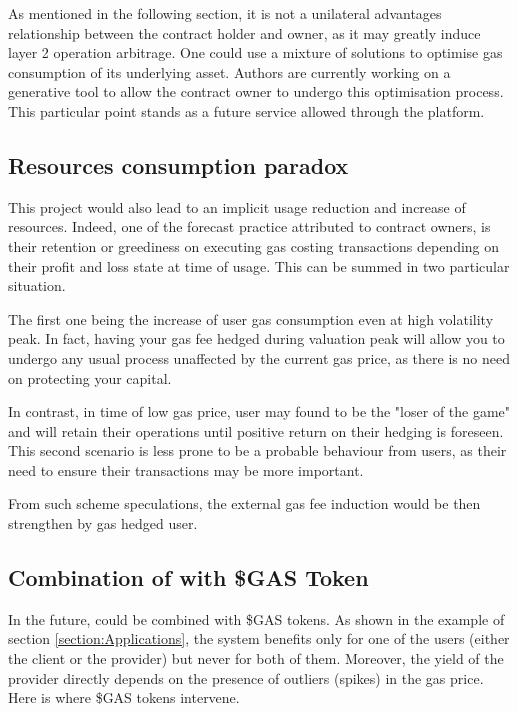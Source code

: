     As mentioned in the following section, it is not a unilateral advantages relationship between the contract holder and owner, as it may greatly induce layer 2 operation arbitrage. One could use a mixture of solutions to optimise gas consumption of its underlying asset. Authors are currently working on a generative tool to allow the contract owner to undergo this optimisation process. This particular point stands as a future service allowed through the platform. 
     
  \subsection{Resources consumption paradox}

    This project would also lead to an implicit usage reduction and increase of resources. Indeed, one of the forecast practice attributed to contract owners, is their retention or greediness on executing gas costing transactions depending on their profit and loss state at time of usage. This can be summed in two particular situation.
    
    The first one being the increase of user gas consumption even at high volatility peak. In fact, having your gas fee hedged during valuation peak will allow you to undergo any usual process unaffected by the current gas price, as there is no need on protecting your capital.
    
    In contrast, in time of low gas price, user may found to be the "loser of the game" and will retain their operations until positive return on their hedging is foreseen. This second scenario is less prone to be a probable behaviour from users, as their need to ensure their transactions may be more important.
    
    From such scheme speculations, the external gas fee induction would be then strengthen by gas hedged user.
     
 \subsection{Combination of {\projectName} with \$GAS Token} \label{section:future:gas-token}

    In the future, {\projectName} could be combined with \$GAS tokens. As shown in the example of section \ref{section:Applications}, the system benefits only for one of the users (either the client or the provider) but never for both of them.  Moreover, the yield of the provider directly depends on the presence of outliers (spikes) in the gas price. Here is where \$GAS tokens intervene.


